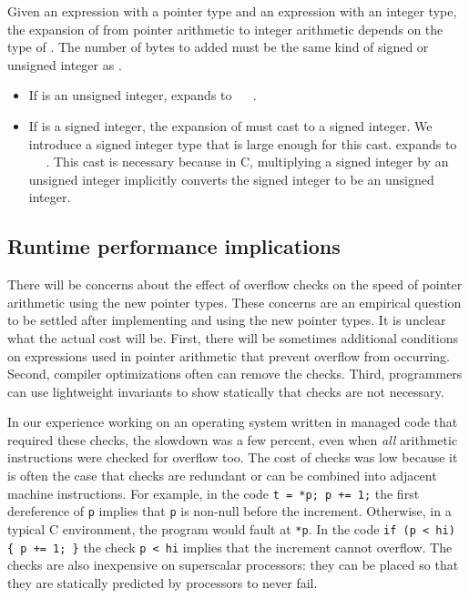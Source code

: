 Given an expression  with a pointer type and an expression
 with an integer type, the expansion of  from
pointer arithmetic to integer arithmetic depends on the type of
. The number of bytes to added must be the same kind of
signed or unsigned integer as .

\begin{itemize}
\item
  If  is an unsigned integer,  expands to
   \plusovf\  \mulovf\ .
\item
  If  is a signed integer, the expansion of 
  must cast  to a signed integer. We introduce a
  signed integer type  that is large enough for
  this cast.  expands to  \plusovf\ 
   \code{)} \mulovf\ . This cast is
  necessary because in C, multiplying a signed integer by an unsigned
  integer implicitly converts the signed integer to be an unsigned
  integer.
\end{itemize}

\subsection{Runtime performance implications}

There will be concerns about the effect of overflow checks on the speed
of pointer arithmetic using the new pointer types. These concerns are an
empirical question to be settled after implementing and using the new
pointer types. It is unclear what the actual cost will be. First, there
will be sometimes additional conditions on expressions used in
pointer arithmetic that prevent overflow from occurring. Second,
compiler optimizations often can remove the checks. Third, programmers
can use lightweight invariants to show statically that checks are not
necessary.

In our experience working on an operating system written in managed code
that required these checks, the slowdown was a few percent, even when
\emph{all} arithmetic instructions were checked for overflow too. The
cost of checks was low because it is often the case that checks are
redundant or can be combined into adjacent machine instructions. For
example, in the code \lstinline|t = *p; p += 1;| the first dereference of
\lstinline+p+ implies that \lstinline+p+ is non-null before the increment.
Otherwise, in a typical C environment, the program would fault at
\lstinline+*p+. In the code \lstinline|if (p < hi) { p += 1; }|
the check \lstinline+p < hi+ implies that the increment cannot
overflow. The checks are also inexpensive on superscalar processors:
they can be placed so that they are statically predicted by 
processors to never fail.

